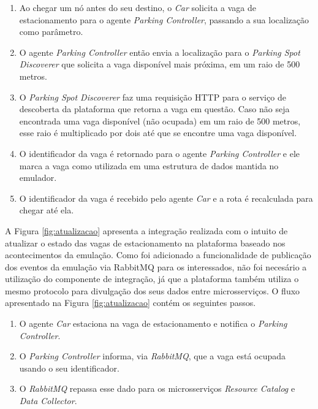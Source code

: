 \begin{enumerate}
    \item Ao chegar um nó antes do seu destino, o \textit{Car} solicita a vaga de estacionamento para o agente \textit{Parking Controller}, passando a sua
	localização como parâmetro.

	\item O agente \textit{Parking Controller} então envia a localização para o \textit{Parking Spot Discoverer} que solicita a vaga disponível mais próxima,
	em um raio de 500 metros.

	\item O \textit{Parking Spot Discoverer} faz uma requisição HTTP para o serviço de descoberta da plataforma que retorna a vaga em questão.
	Caso não seja encontrada uma vaga disponível (não ocupada) em um raio de 500 metros, esse raio é multiplicado por dois até que se encontre uma vaga
	disponível.

	\item O identificador da vaga é retornado para o agente \textit{Parking Controller} e ele marca a vaga como utilizada em uma estrutura de dados mantida no emulador.

    \item O identificador da vaga é recebido pelo agente \textit{Car} e a rota é recalculada para chegar até ela.
\end{enumerate}


A Figura \ref{fig:atualizacao} apresenta a integração realizada com o intuito de atualizar o estado das vagas de estacionamento na plataforma baseado nos
acontecimentos da emulação.
Como foi adicionado a funcionalidade de publicação dos eventos da emulação via RabbitMQ para os interessados, não foi necesário a utilização do
componente de integração, já que a plataforma também utiliza o mesmo protocolo para divulgação dos seus dados entre microsserviços.
O fluxo apresentado na Figura \ref{fig:atualizacao} contém os seguintes passos.

\begin{enumerate}
    \item O agente \textit{Car} estaciona na vaga de estacionamento e notifica o \textit{Parking Controller}.

	\item O \textit{Parking Controller} informa, via \textit{RabbitMQ}, que a vaga está ocupada usando o seu identificador.

	\item O \textit{RabbitMQ} repassa esse dado para os microsserviços \textit{Resource Catalog} e \textit{Data Collector}.
\end{enumerate}

